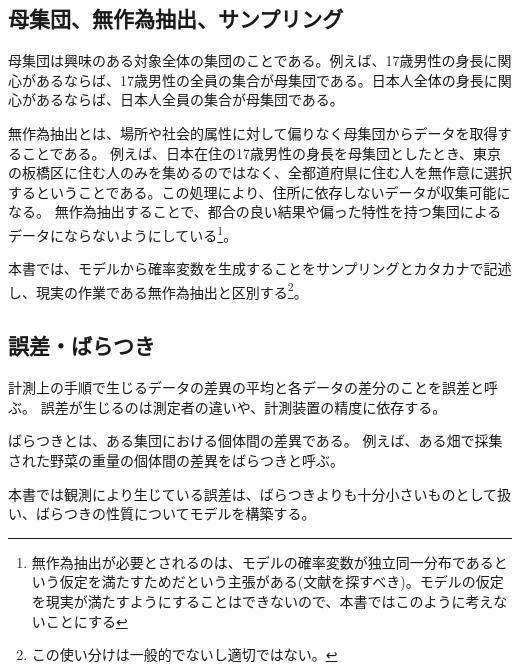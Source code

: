 \subsection{母集団、無作為抽出、サンプリング}
母集団は興味のある対象全体の集団のことである。例えば、17歳男性の身長に関心があるならば、17歳男性の全員の集合が母集団である。日本人全体の身長に関心があるならば、日本人全員の集合が母集団である。

無作為抽出とは、場所や社会的属性に対して偏りなく母集団からデータを取得することである。
例えば、日本在住の17歳男性の身長を母集団としたとき、東京の板橋区に住む人のみを集めるのではなく、全都道府県に住む人を無作意に選択するということである。この処理により、住所に依存しないデータが収集可能になる。
無作為抽出することで、都合の良い結果や偏った特性を持つ集団によるデータにならないようにしている\footnote{無作為抽出が必要とされるのは、モデルの確率変数が独立同一分布であるという仮定を満たすためだという主張がある(文献を探すべき)。モデルの仮定を現実が満たすようにすることはできないので、本書ではこのように考えないことにする}。


本書では、モデルから確率変数を生成することをサンプリングとカタカナで記述し、現実の作業である無作為抽出と区別する\footnote{この使い分けは一般的でないし適切ではない。}。

\subsection{誤差・ばらつき}
計測上の手順で生じるデータの差異の平均と各データの差分のことを誤差と呼ぶ。
誤差が生じるのは測定者の違いや、計測装置の精度に依存する。

ばらつきとは、ある集団における個体間の差異である。
例えば、ある畑で採集された野菜の重量の個体間の差異をばらつきと呼ぶ。

本書では観測により生じている誤差は、ばらつきよりも十分小さいものとして扱い、ばらつきの性質についてモデルを構築する。

